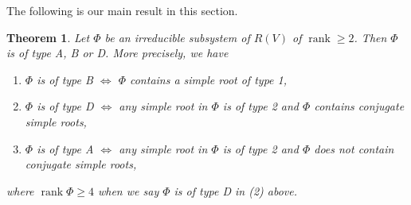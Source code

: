 \documentclass[12pt]{amsart}
\theoremstyle{plain} \numberwithin{equation}{section}
\newtheorem{theo}{Theorem}[section]
\theoremstyle{definition}
\def\MV{V}
\DeclareMathOperator{\rank}{rank}
\begin{document}
The following is our main result in this section. 

\begin{theo} \label{theo:2-1}
Let $\Phi$ be an irreducible subsystem of $R(\MV)$ of $\rank\ge 2$. Then $\Phi$ is of type A, B or D. More precisely, we have 
\begin{enumerate}
\item $\Phi$ is of type B $\Longleftrightarrow$ $\Phi$ contains a simple root of type 1, 
\item $\Phi$ is of type D $\Longleftrightarrow$ any simple root in $\Phi$ is of type 2 and $\Phi$ contains conjugate simple roots,
\item $\Phi$ is of type A $\Longleftrightarrow$ any simple root in $\Phi$ is of type 2 and $\Phi$ does not contain conjugate simple roots,
\end{enumerate} 
where $\rank\Phi\ge 4$ when we say $\Phi$ is of type D in {\rm (2)} above.%
\end{theo}
\end{document}
